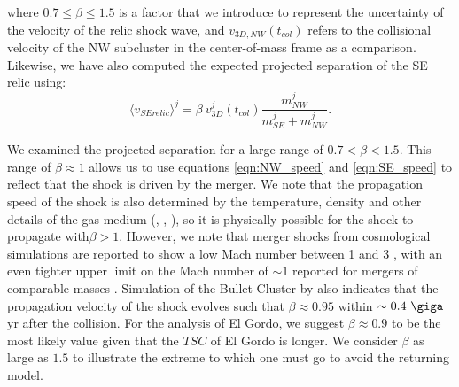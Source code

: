 where $0.7 \leq \beta \leq 1.5$ is a factor that we introduce to represent the
uncertainty of the velocity of the relic shock wave, and $v_{3D, NW}(t_{col})$ refers to the collisional velocity of
the NW subcluster in the center-of-mass frame as a comparison. 
Likewise, we have also computed the expected projected separation of the SE
relic using:  
\begin{equation}
	\label{eqn:SE_speed}
	\langle v_{SE relic} \rangle^j = \beta~v^j_{3D}(t_{col}) \frac{m^j_{NW}}{m^j_{SE} + m^j_{NW}}. 
\end{equation}
\par 
We examined the projected separation for a large range of $0.7 <\beta <
1.5$. This range of $\beta \approx 1$ allows us to use  
equations \ref{eqn:NW_speed} and \ref{eqn:SE_speed} to reflect that the
shock is driven by the merger. We note that the propagation speed of the
shock is also determined by the temperature, density and other details of
the gas medium (\citealt{Prokhorov2007}, \citealt{Springel2007},
\citealt{Milosavljevic07}), so it is physically possible for the shock to
propagate with$\beta > 1$. However, we note that merger shocks from cosmological
simulations are reported to show a low Mach number between 1 and 3
\citep{Bruggen2011}, with an even tighter upper limit on the Mach number of
$\sim 1$ reported for mergers of comparable masses \citep{Markevitch2007}.    
Simulation of the Bullet Cluster by \cite{Springel2007} also indicates that the
propagation velocity of the shock evolves such that $\beta \approx 0.95$ within
$\sim 0.4~\giga$yr after the collision. For the analysis of El Gordo,
we suggest $\beta \approx 0.9$ to be the most likely value given that the $TSC$ of
El Gordo is longer. We consider $\beta$ as large as $1.5$ to illustrate the
extreme to which one must go to avoid the returning model.
\label{sec:positionprior}

